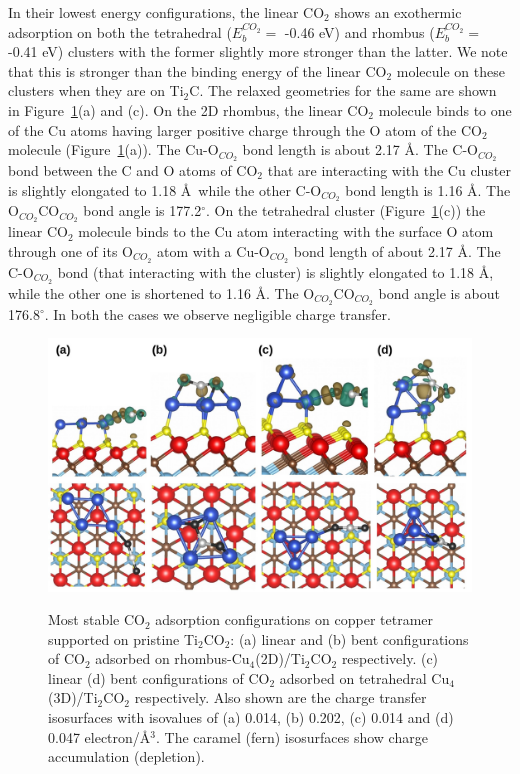 In their lowest energy configurations, the linear CO$_2$ shows an exothermic adsorption 
on both the tetrahedral ($E_b^{CO_2}=$ -0.46 eV) and rhombus ($E_b^{CO_2}=$ -0.41 eV) 
clusters with the former slightly more stronger than the latter. We note that this is 
stronger than the binding energy of the linear CO$_2$ molecule on these clusters when they are on Ti$_2$C. 
The relaxed geometries for the same are shown in 
Figure~\ref{co2_ti2co2}(a) and (c). On the 2D rhombus, the linear CO$_2$ molecule binds 
to one of the Cu atoms having larger positive charge through 
the O atom of the CO$_2$ molecule (Figure~\ref{co2_ti2co2}(a)). The Cu-O$_{CO_2}$ bond 
length is about 2.17 \AA. The C-O$_{CO_2}$ bond between the C and O atoms of CO$_2$
that are interacting with the Cu cluster is slightly elongated to 1.18 \AA~while the 
other C-O$_{CO_2}$ bond length is 1.16 \AA. The O$_{CO_2}$CO$_{CO_2}$ bond angle is 
177.2$^{\circ}$. On the tetrahedral cluster (Figure~\ref{co2_ti2co2}(c)) the linear 
CO$_2$ molecule binds to the Cu atom interacting with the surface O atom through one of 
its O$_{CO_2}$ atom with a Cu-O$_{CO_2}$ bond length of about 
2.17 \AA. The C-O$_{CO_2}$ bond (that interacting with the cluster) is slightly 
elongated to 1.18 \AA, while the other one is shortened to 1.16 \AA. The 
O$_{CO_2}$CO$_{CO_2}$ bond angle is about 176.8$^{\circ}$. In both the cases we observe 
negligible charge transfer. 

\begin{figure}[ht]
 \begin{center}	
    \includegraphics[width=12cm]{./Appendix2/Appendix2_figures/figure8.jpg} \\[0cm]
 \end{center}
 \caption{Most stable CO$_2$ adsorption configurations on copper tetramer supported on pristine Ti$_2$CO$_2$: (a) linear and (b) bent configurations of CO$_2$ adsorbed on rhombus-Cu$_4$(2D)/Ti$_2$CO$_2$ respectively.
 (c) linear (d) bent configurations of CO$_2$ adsorbed on tetrahedral Cu$_4$(3D)/Ti$_2$CO$_2$ respectively.
 Also shown are the charge transfer isosurfaces with isovalues of (a) 0.014, (b) 0.202, (c) 0.014 and
 (d) 0.047 electron/Å$^3$. The caramel (fern) isosurfaces show charge accumulation (depletion).}
  \label{co2_ti2co2}
\end{figure}
 
